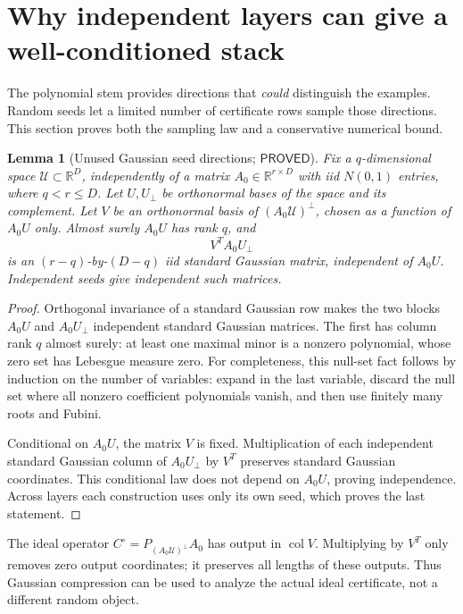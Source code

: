 \documentclass[12pt,a4paper]{article}
\theoremstyle{readable}
\newtheorem{lemma}[theorem]{Lemma}
\theoremstyle{definition}\newtheorem{example}[theorem]{Example}
\newcommand{\R}{\mathbb R}\newcommand{\rank}{\operatorname{rank}}
\newcommand{\col}{\operatorname{col}}\newcommand{\row}{\operatorname{row}}
\newcommand{\PP}{\mathsf{PROVED}}\newcommand{\FF}{\mathsf{FALSE}}
\begin{document}
\section{Why independent layers can give a well-conditioned stack}
\label{sec:gaussian}

The polynomial stem provides directions that \emph{could} distinguish the examples. Random seeds let a limited number of certificate rows sample those directions. This section proves both the sampling law and a conservative numerical bound.

\begin{lemma}[Unused Gaussian seed directions; \(\PP\)]\label{lem:gauss}
Fix a \(q\)-dimensional space \(\mathcal U\subset\R^D\), independently of a matrix \(A_0\in\R^{r\times D}\) with iid \(N(0,1)\) entries, where \(q<r\le D\). Let \(U,U_\perp\) be orthonormal bases of the space and its complement. Let \(V\) be an orthonormal basis of \((A_0\mathcal U)^\perp\), chosen as a function of \(A_0U\) only. Almost surely \(A_0U\) has rank \(q\), and
\[
V^TA_0U_\perp
\]
is an \((r-q)\)-by-\((D-q)\) iid standard Gaussian matrix, independent of \(A_0U\). Independent seeds give independent such matrices.
\end{lemma}
\begin{proof}
Orthogonal invariance of a standard Gaussian row makes the two blocks \(A_0U\) and \(A_0U_\perp\) independent standard Gaussian matrices. The first has column rank \(q\) almost surely: at least one maximal minor is a nonzero polynomial, whose zero set has Lebesgue measure zero. For completeness, this null-set fact follows by induction on the number of variables: expand in the last variable, discard the null set where all nonzero coefficient polynomials vanish, and then use finitely many roots and Fubini.

Conditional on \(A_0U\), the matrix \(V\) is fixed. Multiplication of each independent standard Gaussian column of \(A_0U_\perp\) by \(V^T\) preserves standard Gaussian coordinates. This conditional law does not depend on \(A_0U\), proving independence. Across layers each construction uses only its own seed, which proves the last statement.
\end{proof}
The ideal operator \(C^\circ=P_{(A_0\mathcal U)^\perp}A_0\) has output in \(\col V\). Multiplying by \(V^T\) only removes zero output coordinates; it preserves all lengths of these outputs. Thus Gaussian compression can be used to analyze the actual ideal certificate, not a different random object.
\end{document}
